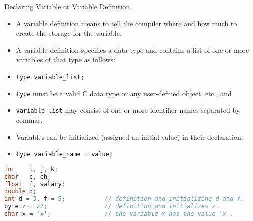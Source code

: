 \documentclass[10pt,t]{beamer}
\begin{document}
\begin{frame}[fragile]{Declaring Variable or Variable Definition}
  \begin{itemize}
    \item A variable definition means to tell the compiler where and how much to create the storage for the variable. 
    \item A variable definition specifies a data type and contains a list of one or more variables of that type as follows:
    \item[] \lstinline[basicstyle=\scriptsize\ttfamily]{type variable_list;}
    \item \lstinline[basicstyle=\scriptsize\ttfamily]{type} must be a valid C data type or any user-defined object, etc., and 
    \item[] \lstinline[basicstyle=\scriptsize\ttfamily]{variable_list} may consist of one or more identifier names separated by commas.
    \item Variables can be initialized (assigned an initial value) in their declaration.
    \item[] \lstinline[basicstyle=\scriptsize\ttfamily]{type variable_name = value;}
  \end{itemize}
  \begin{lstlisting}[language=C,basicstyle=\scriptsize\ttfamily]
int    i, j, k;
char   c, ch;
float  f, salary;
double d;
int d = 3, f = 5;           // definition and initializing d and f. 
byte z = 22;                // definition and initializes z. 
char x = 'x';               // the variable x has the value 'x'.
  \end{lstlisting}
\end{frame}
\end{document}
